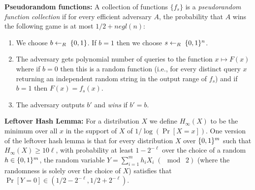 \documentclass{article}
\begin{document}
\textbf{Pseudorandom functions:}
A collection of functions $\{ f_s \}$ is a \emph{pseudorandom function collection} if for every efficient adversary $A$, the probability that $A$ wins the following game is at most $1/2+negl(n)$:%

\begin{enumerate}[noitemsep,topsep=\mdcompacttopsep]%

\item{}We choose $b\leftarrow_R\;\{0,1\}$. If $b=1$ then we choose $s\leftarrow_R\;\{0,1\}^n$.%

\item{}The adversary gets polynomial number of queries to the function $x \mapsto F(x)$ where if $b=0$ then this is a random function (i.e., for every distinct query $x$ returning an independent random string in the output range of $f_s$) and if $b=1$ then $F(x)=f_s(x)$.%

\item{}The adversary outputs $b'$ and \emph{wins} if $b'=b$.%
\end{enumerate}%

\noindent{}\textbf{Leftover Hash Lemma:} For a distribution $X$ we define $H_\infty(X)$ to be the minimum over all $x$ in the support of $X$ of $1/\log(\Pr[X=x])$.
One version of the leftover hash lemma is that for every distribution $X$ over $\{0,1\}^m$ such that $H_{\infty}(X) \geq 10\ell$, with probability at least $1-2^{-\ell}$ over the choice
of a random $h\in \{0,1\}^m$, the random variable $Y= \sum_{i=1}^m h_i X_i \; (\mod \; 2)$ (where the randomness is solely over the choice of $X$) satisfies that $\Pr[ Y= 0 ] \in (1/2 - 2^{-\ell}, 1/2 + 2^{-\ell})$.%
\end{document}
